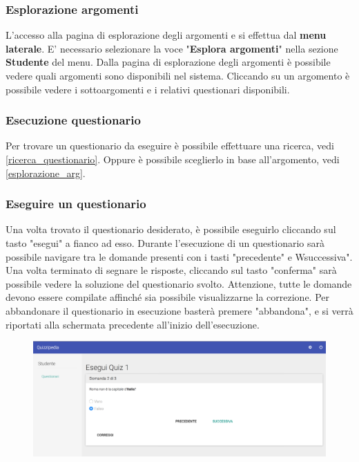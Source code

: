 \documentclass[12pt,a4paper]{article}
\begin{document}
	
	\subsubsection{Esplorazione argomenti}	
	
	 \label{esplorazione_arg}
	L'accesso alla pagina di esplorazione degli argomenti e si effettua dal \textbf{menu laterale}. 
	E' necessario selezionare la voce "\textbf{Esplora argomenti}" nella sezione \textbf{Studente} del menu.
	Dalla pagina di esplorazione degli argomenti è possibile vedere quali argomenti sono disponibili nel sistema. Cliccando su un argomento è possibile vedere i sottoargomenti e i relativi questionari disponibili.
	
	\subsubsection{Esecuzione questionario}
	Per trovare un questionario da eseguire è possibile effettuare una ricerca, vedi \ref{ricerca_questionario}.
	Oppure è possibile sceglierlo in base all'argomento, vedi \ref{esplorazione_arg}.
	\subsubsection{Eseguire un questionario}
	Una  volta trovato il questionario desiderato, è possibile eseguirlo cliccando sul tasto "esegui" a fianco ad esso.
	Durante l'esecuzione di un questionario sarà possibile navigare tra le domande presenti con i tasti "precedente" e Wsuccessiva".
	Una volta terminato di segnare le risposte, cliccando sul tasto "conferma" sarà possibile vedere la soluzione del questionario svolto.
	Attenzione, tutte le domande devono essere compilate affinché sia possibile visualizzarne la correzione.
	Per abbandonare il questionario in esecuzione basterà premere "abbandona", e si verrà riportati alla schermata precedente all'inizio dell'esecuzione.
	
	\begin{figure}[H]	
		\centering
		\includegraphics[width=1.0\linewidth]{../img/screenshot/esecuzioneQuestionario.png}
		\caption{}
		\label{Eseguire questionario}
	\end{figure}
	
\end{document}
